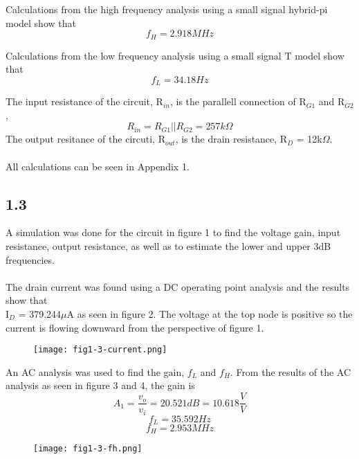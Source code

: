   Calculations from the high frequency analysis using a small signal hybrid-pi model show that $$f_{H} = 2.918MHz$$

  Calculations from the low frequency analysis using a small signal T model show that $$f_{L} = 34.18Hz$$

  The input resistance of the circuit, R$_{in}$, is the parallell connection of R$_{G1}$ and R$_{G2}$, $$R_{in} = R_{G1}||R_{G2} = 257k\Omega$$
  The output resitance of the circuti, R$_{out}$, is the drain resistance, R$_D$ = 12k$\Omega$.\\\\

  All calculations can be seen in Appendix 1.\\
\pagebreak
\subsection*{1.3}

  A simulation was done for the circuit in figure 1 to find the voltage gain, input resistance, output resistance, as well as to estimate the lower and upper 3dB frequencies.\\\\

  The drain current was found using a DC operating point analysis and the results show that \\I$_D$ = 379.244$\mu$A as seen in figure 2. The voltage at the top node is positive so the current is flowing downward from the perspective of figure 1.\\

  \begin{figure}[h!]
        \centering
        \texttt{[image: fig1-3-current.png]}
  \end{figure}

\pagebreak

  An AC analysis was used to find the gain, $f_{L}$ and $f_{H}$. From the results of the AC analysis as seen in figure 3 and 4, the gain is $$A_1 = \frac{v_o}{v_i} = 20.521 dB = 10.618 \frac{V}{V}$$ $$f_{L} = 35.592 Hz$$ $$f_{H} = 2.953MHz$$

  \begin{figure}[h!]
        \centering
        \texttt{[image: fig1-3-fh.png]}
  \end{figure}

